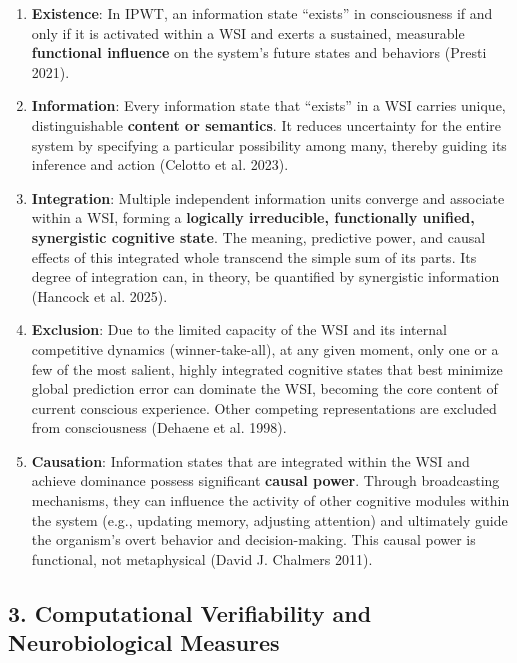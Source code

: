 \documentclass[
  a4paper]{article}
\providecommand{\tightlist}{%
  \setlength{\itemsep}{0pt}\setlength{\parskip}{0pt}}
\begin{document}
\begin{enumerate}
  \begin{enumerate}
  \def\labelenumii{\arabic{enumii}.}
  \tightlist
  \item
    \textbf{Existence}: In IPWT, an information state ``exists'' in
    consciousness if and only if it is activated within a WSI and exerts
    a sustained, measurable \textbf{functional influence} on the
    system's future states and behaviors (Presti 2021).
  \item
    \textbf{Information}: Every information state that ``exists'' in a
    WSI carries unique, distinguishable \textbf{content or semantics}.
    It reduces uncertainty for the entire system by specifying a
    particular possibility among many, thereby guiding its inference and
    action (Celotto et al. 2023).
  \item
    \textbf{Integration}: Multiple independent information units
    converge and associate within a WSI, forming a \textbf{logically
    irreducible, functionally unified, synergistic cognitive state}. The
    meaning, predictive power, and causal effects of this integrated
    whole transcend the simple sum of its parts. Its degree of
    integration can, in theory, be quantified by synergistic information
    (Hancock et al. 2025).
  \item
    \textbf{Exclusion}: Due to the limited capacity of the WSI and its
    internal competitive dynamics (winner-take-all), at any given
    moment, only one or a few of the most salient, highly integrated
    cognitive states that best minimize global prediction error can
    dominate the WSI, becoming the core content of current conscious
    experience. Other competing representations are excluded from
    consciousness (Dehaene et al. 1998).
  \item
    \textbf{Causation}: Information states that are integrated within
    the WSI and achieve dominance possess significant \textbf{causal
    power}. Through broadcasting mechanisms, they can influence the
    activity of other cognitive modules within the system (e.g.,
    updating memory, adjusting attention) and ultimately guide the
    organism's overt behavior and decision-making. This causal power is
    functional, not metaphysical (David J. Chalmers 2011).
  \end{enumerate}
\end{enumerate}

\subsection{3. Computational Verifiability and Neurobiological
Measures}\label{computational-verifiability-and-neurobiological-measures}
\end{document}

